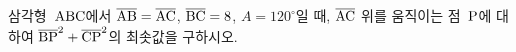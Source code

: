 삼각형~$\pt{ABC}$에서 $\seg{AB}=\seg{AC}$, $\seg{BC}=8$, $A=120^\circ$일 때, $\seg{AC}$ 위를 움직이는 점~$\pt{P}$에 대하여 $\seg{BP}^2+\seg{CP}^2$의 최솟값을 \mbox{구하시오.}
